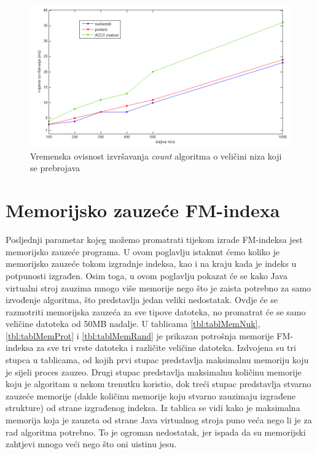 \begin{figure}[H]
   \centering
       \includegraphics[width=\textwidth]{./pictures/test_count.png}
 \caption{Vremenska ovisnost izvršavanja \emph{count} algoritma o veličini niza koji se prebrojava}
 \label{fig:test_count}
\end{figure}


\section{Memorijsko zauzeće FM-indexa}

Posljednji parametar kojeg možemo promatrati tijekom izrade FM-indeksa jest memorijsko zauzeće programa. U ovom poglavlju istaknut ćemo koliko je memorijsko zauzeće tokom izgradnje indeksa, kao i na kraju kada je indeks u potpunosti izgrađen. Osim toga, u ovom poglavlju pokazat će se kako Java virtualni stroj zauzima mnogo više memorije nego što je zaista potrebno za samo izvođenje algoritma, što predstavlja jedan veliki nedostatak. Ovdje će se razmotriti memorijska zauzeća za sve tipove datoteka, no promatrat će se samo veličine datoteka od 50MB nadalje. U tablicama \ref{tbl:tablMemNuk}, \ref{tbl:tablMemProt} i \ref{tbl:tablMemRand} je prikazan potrošnja memorije FM-indeksa za sve tri vrste datoteka i različite veličine datoteka. Izdvojena su tri stupca u tablicama, od kojih prvi stupac predstavlja maksimalnu memoriju koju je sijeli proces zauzeo. Drugi stupac predstavlja maksimalnu količinu memorije koju je algoritam u nekom trenutku koristio, dok treći stupac predstavlja stvarno zauzeće memorije (dakle količinu memorije koju stvarno zauzimaju izgrađene strukture) od strane izgrađenog indeksa. Iz tablica se vidi kako je maksimalna memorija koja je zauzeta od strane Java virtualnog stroja puno veća nego li je za rad algoritma potrebno. To je ogroman nedostatak, jer ispada da su memorijski zahtjevi mnogo veći nego što oni uistinu jesu.


